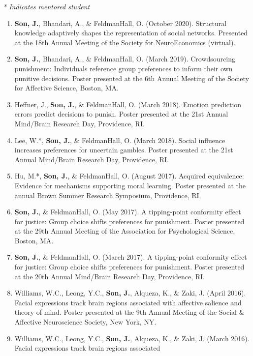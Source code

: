 \documentclass[
]{article}
\begin{document}
\emph{* Indicates mentored student}

\begin{enumerate}
\def\labelenumi{\arabic{enumi}.}
\item
  \textbf{Son, J.}, Bhandari, A., \& FeldmanHall, O. (October 2020).
  Structural knowledge adaptively shapes the representation of social
  networks. Presented at the 18th Annual Meeting of the Society for
  NeuroEconomics (virtual).
\item
  \textbf{Son, J.}, Bhandari, A., \& FeldmanHall, O. (March 2019).
  Crowdsourcing punishment: Individuals reference group preferences to
  inform their own punitive decisions. Poster presented at the 6th
  Annual Meeting of the Society for Affective Science, Boston, MA.
\item
  Heffner, J., \textbf{Son, J.}, \& FeldmanHall, O. (March 2018).
  Emotion prediction errors predict decisions to punish. Poster
  presented at the 21st Annual Mind/Brain Research Day, Providence, RI.
\item
  Lee, W.*, \textbf{Son, J.}, \& FeldmanHall, O. (March 2018). Social
  influence increases preferences for uncertain gambles. Poster
  presented at the 21st Annual Mind/Brain Research Day, Providence, RI.
\item
  Hu, M.*, \textbf{Son, J.}, \& FeldmanHall, O. (August 2017). Acquired
  equivalence: Evidence for mechanisms supporting moral learning. Poster
  presented at the annual Brown Summer Research Symposium, Providence,
  RI.
\item
  \textbf{Son, J.}, \& FeldmanHall, O. (May 2017). A tipping-point
  conformity effect for justice: Group choice shifts preferences for
  punishment. Poster presented at the 29th Annual Meeting of the
  Association for Psychological Science, Boston, MA.
\item
  \textbf{Son, J.}, \& FeldmanHall, O. (March 2017). A tipping-point
  conformity effect for justice: Group choice shifts preferences for
  punishment. Poster presented at the 20th Annual Mind/Brain Research
  Day, Providence, RI.
\item
  Williams, W.C., Leong, Y.C., \textbf{Son, J.}, Alqueza, K., \& Zaki,
  J. (April 2016). Facial expressions track brain regions associated
  with affective salience and theory of mind. Poster presented at the
  9th Annual Meeting of the Social \& Affective Neuroscience Society,
  New York, NY.
\item
  Williams, W.C., Leong, Y.C., \textbf{Son, J.}, Alqueza, K., \& Zaki,
  J. (March 2016). Facial expressions track brain regions associated

\end{enumerate}
\end{document}
